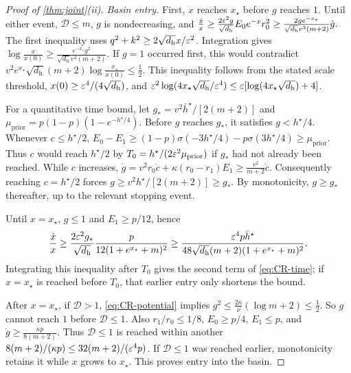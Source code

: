 \begin{proof}[Proof of \cref{thm:joint}(ii)]
\emph{Basin entry.}
First, $x$ reaches $x_\star$ before $g$ reaches $1$. Until either event, $\mathcal D\le m$, $g$ is nondecreasing, and
 $\frac{\dot x}{x}\ge\frac{2\varepsilon^2g}{\sqrt{d_{\mathrm h}}}E_0e^{-x}r_0^2 \ge\frac{2ge^{-x_\star}}{\sqrt{d_{\mathrm h}}v^2(m+2)}\dot g.$ 
The first inequality uses $q^2+k^2\ge2\sqrt{d_{\mathrm h}}x/\varepsilon^2$.
Integration gives
 $\log\frac{x}{x(0)}\ge\frac{e^{-x_\star}g^2}{\sqrt{d_{\mathrm h}}v^2(m+2)}.$ 
If $g=1$ occurred first, this would contradict
 $v^2e^{x_\star}\sqrt{d_{\mathrm h}}(m+2)\log\frac{x_\star}{x(0)}\le\frac12.$ 
This inequality follows from the stated scale threshold, $x(0)\ge\varepsilon^4/(4\sqrt{d_{\mathrm h}})$, and
$\varepsilon^2\log(4x_\star\sqrt{d_{\mathrm h}}/\varepsilon^4)\le\varepsilon[\log(4x_\star\sqrt{d_{\mathrm h}})+4]$.

For a quantitative time bound, let $g_*=v^2\bar h^\star/[2(m+2)]$ and
$\mu_{\mathrm{prior}}=p(1-p)(1-e^{-h^\star/4})$.
Before $g$ reaches $g_*$, it satisfies $g<h^\star/4$. Whenever $c\le h^\star/2$,
 $E_0-E_1\ge(1-p)\sigma(-3h^\star/4)-p\sigma(3h^\star/4)\ge\mu_{\mathrm{prior}}.$ 
Thus $c$ would reach $h^\star/2$ by $T_0=h^\star/(2\varepsilon^2\mu_{\mathrm{prior}})$ if $g_*$ had not already been reached.
While $c$ increases,
 $\dot g=v^2r_0\dot c+\kappa(r_0-r_1)E_1\ge\frac{v^2}{m+2}\dot c.$ 
Consequently reaching $c=h^\star/2$ forces $g\ge v^2h^\star/[2(m+2)]\ge g_*$.
By monotonicity, $g\ge g_*$ thereafter, up to the relevant stopping event.

Until $x=x_\star$, $g\le1$ and $E_1\ge p/12$, hence
\[
 \frac{\dot x}{x}\ge\frac{2\varepsilon^2g_*}{\sqrt{d_{\mathrm h}}}
       \frac{p}{12(1+e^{x_\star}+m)^2}
 \ge\frac{\varepsilon^4p\bar h^\star}{48\sqrt{d_{\mathrm h}}(m+2)(1+e^{x_\star}+m)^2}.
\]
Integrating this inequality after $T_0$ gives the second term of \cref{eq:CR-time}; if $x=x_\star$ is reached before $T_0$,
that earlier entry only shortens the bound.

After $x=x_\star$, if $\mathcal D>1$, \eqref{eq:CR-potential} implies
 $g^2\le\frac{2\kappa}{\nu}(\log m+2)\le\frac12.$ 
So $g$ cannot reach $1$ before $\mathcal D\le1$. Also $r_1/r_0\le1/8$, $E_0\ge p/4$, $E_1\le p$, and
 $\dot g\ge\frac{\kappa p}{8(m+2)}.$ 
Thus $\mathcal D\le1$ is reached within another $8(m+2)/(\kappa p)\le32(m+2)/(\varepsilon^4p)$.
If $\mathcal D\le1$ was reached earlier, monotonicity retains it while $x$ grows to $x_\star$.
This proves entry into the basin.


\end{proof}

